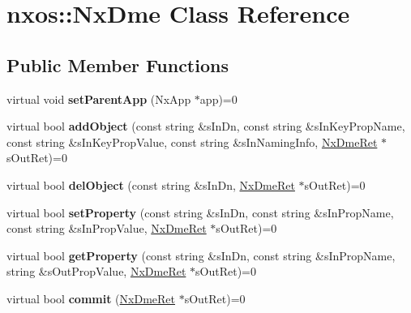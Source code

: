 \hypertarget{classnxos_1_1NxDme}{\section{nxos\-:\-:Nx\-Dme Class Reference}
\label{classnxos_1_1NxDme}
}
\subsection*{Public Member Functions}
\begin{DoxyCompactItemize}
\item 
\hypertarget{classnxos_1_1NxDme_a1212de76252ab0ed1a44d2a7d9a513a8}{virtual void {\bfseries set\-Parent\-App} (Nx\-App $\ast$app)=0}\label{classnxos_1_1NxDme_a1212de76252ab0ed1a44d2a7d9a513a8}

\item 
\hypertarget{classnxos_1_1NxDme_aee1d61bf3b069b82fcb1bfcdeb639e47}{virtual bool {\bfseries add\-Object} (const string \&s\-In\-Dn, const string \&s\-In\-Key\-Prop\-Name, const string \&s\-In\-Key\-Prop\-Value, const string \&s\-In\-Naming\-Info, \hyperlink{classnxos_1_1NxDmeRet}{Nx\-Dme\-Ret} $\ast$s\-Out\-Ret)=0}\label{classnxos_1_1NxDme_aee1d61bf3b069b82fcb1bfcdeb639e47}

\item 
\hypertarget{classnxos_1_1NxDme_a2691d106ba058c03e37f6079231dc46f}{virtual bool {\bfseries del\-Object} (const string \&s\-In\-Dn, \hyperlink{classnxos_1_1NxDmeRet}{Nx\-Dme\-Ret} $\ast$s\-Out\-Ret)=0}\label{classnxos_1_1NxDme_a2691d106ba058c03e37f6079231dc46f}

\item 
\hypertarget{classnxos_1_1NxDme_adf3eb45b61e7b2d68b0d24ab9370b2ba}{virtual bool {\bfseries set\-Property} (const string \&s\-In\-Dn, const string \&s\-In\-Prop\-Name, const string \&s\-In\-Prop\-Value, \hyperlink{classnxos_1_1NxDmeRet}{Nx\-Dme\-Ret} $\ast$s\-Out\-Ret)=0}\label{classnxos_1_1NxDme_adf3eb45b61e7b2d68b0d24ab9370b2ba}

\item 
\hypertarget{classnxos_1_1NxDme_ac6daa277c087384fd770435b0095aeaa}{virtual bool {\bfseries get\-Property} (const string \&s\-In\-Dn, const string \&s\-In\-Prop\-Name, string \&s\-Out\-Prop\-Value, \hyperlink{classnxos_1_1NxDmeRet}{Nx\-Dme\-Ret} $\ast$s\-Out\-Ret)=0}\label{classnxos_1_1NxDme_ac6daa277c087384fd770435b0095aeaa}

\item 
\hypertarget{classnxos_1_1NxDme_a5acb346787baa18b531556451e5f5929}{virtual bool {\bfseries commit} (\hyperlink{classnxos_1_1NxDmeRet}{Nx\-Dme\-Ret} $\ast$s\-Out\-Ret)=0}\label{classnxos_1_1NxDme_a5acb346787baa18b531556451e5f5929}


\end{DoxyCompactItemize}
